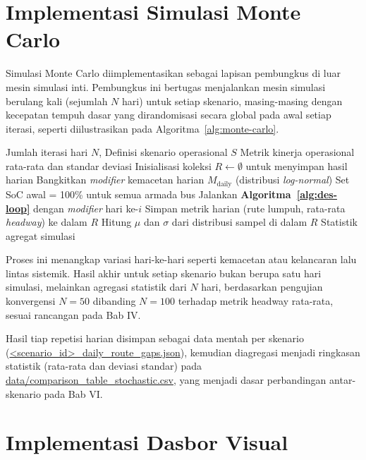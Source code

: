 \section{Implementasi Simulasi Monte Carlo}

Simulasi Monte Carlo diimplementasikan sebagai lapisan pembungkus di luar
mesin simulasi inti. Pembungkus ini bertugas menjalankan mesin simulasi
berulang kali (sejumlah $N$ hari) untuk setiap skenario, masing-masing dengan
kecepatan tempuh dasar yang dirandomisasi secara global pada awal setiap iterasi, 
seperti diilustrasikan pada Algoritma~\ref{alg:monte-carlo}.

\begin{algorithm}[h!]
\caption{Pembungkus Simulasi \textit{Monte Carlo} Multi-hari}
\label{alg:monte-carlo}
\begin{algorithmic}[1]
\Require Jumlah iterasi hari $N$, Definisi skenario operasional $S$
\Ensure Metrik kinerja operasional rata-rata dan standar deviasi
\State Inisialisasi koleksi $R \gets \emptyset$ untuk menyimpan hasil harian
    \State Bangkitkan \textit{modifier} kemacetan harian $M_{\text{daily}}$ (distribusi \textit{log-normal})
    \State Set SoC awal = 100\% untuk semua armada bus
    \State Jalankan \textbf{Algoritma~\ref{alg:des-loop}} dengan \textit{modifier} hari ke-$i$
    \State Simpan metrik harian (rute lumpuh, rata-rata \textit{headway}) ke dalam $R$
\EndFor
\State Hitung $\mu$ dan $\sigma$ dari distribusi sampel di dalam $R$
\State \Return Statistik agregat simulasi
\end{algorithmic}
\end{algorithm}

Proses ini menangkap variasi hari-ke-hari seperti kemacetan atau kelancaran
lalu lintas sistemik. Hasil akhir untuk setiap skenario bukan berupa satu
hari simulasi, melainkan agregasi statistik dari $N$ hari, berdasarkan
pengujian konvergensi $N=50$ dibanding $N=100$ terhadap metrik headway
rata-rata, sesuai rancangan pada Bab IV.

Hasil tiap repetisi harian disimpan sebagai data mentah per skenario
(\url{<scenario_id>_daily_route_gaps.json}), kemudian diagregasi
menjadi ringkasan statistik (rata-rata dan deviasi standar) pada
\url{data/comparison_table_stochastic.csv}, yang menjadi dasar
perbandingan antar-skenario pada Bab VI.

\section{Implementasi Dasbor Visual}


